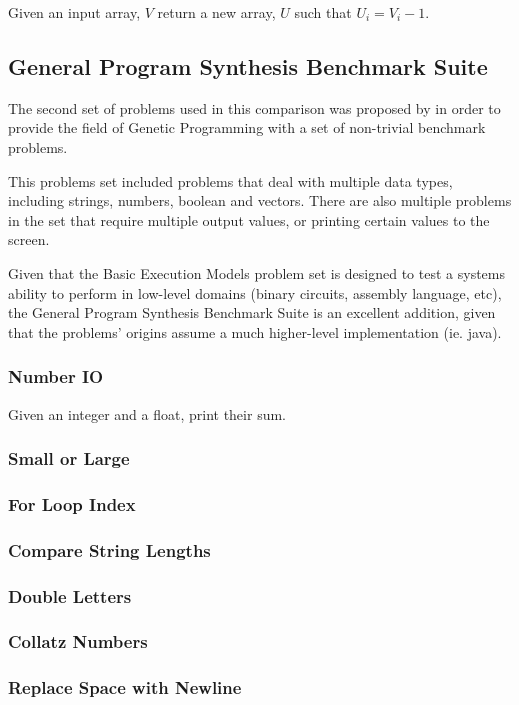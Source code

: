 Given an input array, $V$ return a new array, $U$ such that $U_i = V_i - 1$.


\subsection{General Program Synthesis Benchmark Suite}
The second set of problems used in this comparison was proposed by \cite{Helmuth2015b} in order to provide the field of Genetic Programming with a set of non-trivial benchmark problems.

This problems set included problems that deal with multiple data types, including strings, numbers, boolean and vectors. There are also multiple problems in the set that require multiple output values, or printing certain values to the screen.

Given that the Basic Execution Models problem set is designed to test a systems ability to perform in low-level domains (binary circuits, assembly language, etc), the General Program Synthesis Benchmark Suite is an excellent addition, given that the problems' origins assume a much higher-level implementation (ie. java).

\subsubsection{Number IO}
Given an integer and a float, print their sum.
\subsubsection{Small or Large}
\subsubsection{For Loop Index}
\subsubsection{Compare String Lengths}
\subsubsection{Double Letters}
\subsubsection{Collatz Numbers}
\subsubsection{Replace Space with Newline}
